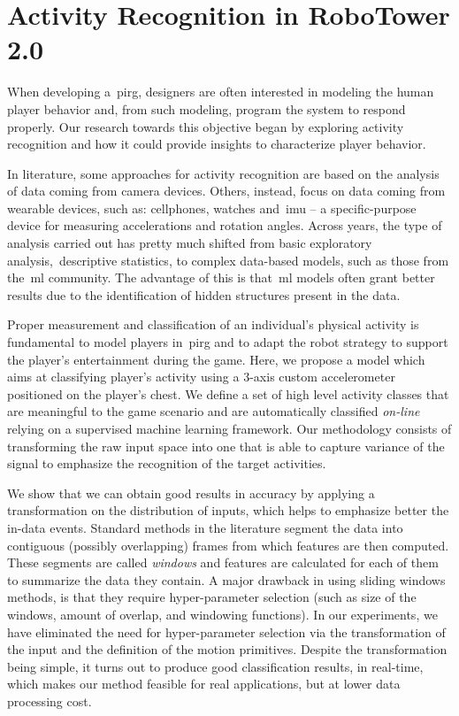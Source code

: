 \chapter{Activity Recognition in RoboTower 2.0}\label{ch:activity}
When developing a~\gls{pirg}, designers are often interested in modeling the human player behavior and, from such modeling, program the system to respond properly. Our research towards this objective began by exploring activity recognition and how it could provide insights to characterize player behavior. 

In literature, some approaches for activity recognition are based on the analysis of data coming from camera devices. Others, instead, focus on data coming from wearable devices, such as: cellphones, watches and~\gls{imu} -- a specific-purpose device for measuring accelerations and rotation angles. Across years, the type of analysis carried out has pretty much shifted from basic exploratory analysis,~\eg descriptive statistics, %
to complex data-based models, such as those from the~\gls{ml} community. The advantage of this is that~\gls{ml} models often grant better results due to the identification of hidden structures present in the data.

Proper measurement and classification of an individual's physical activity is fundamental to model players in~\gls{pirg} and to adapt the robot strategy to support the player's entertainment during the game. Here, we propose a model which aims at classifying player's activity using a 3-axis custom accelerometer positioned on the player's chest. We define a set of high level activity classes that are meaningful to the game scenario and are automatically classified \textit{on-line} relying on a supervised machine learning framework. Our methodology consists of transforming the raw input space into one that is able to capture variance of the signal to emphasize the recognition of the target activities. 

We show that we can obtain good results in accuracy by applying a transformation on the distribution of inputs, which helps to emphasize better the in-data events. Standard methods in the literature segment the data into contiguous (possibly overlapping) frames from which features are then computed. These segments are called \textit{windows} and features are calculated for each of them to summarize the data they contain. A major drawback in using sliding windows methods, is that they require hyper-parameter selection (such as size of the windows, amount of overlap, and windowing functions). In our experiments, we have eliminated the need for hyper-parameter selection via the transformation of the input and the definition of the motion primitives. Despite the transformation being simple, it turns out to produce good classification results, in real-time, which makes our method feasible for real applications, but at lower data processing cost.

